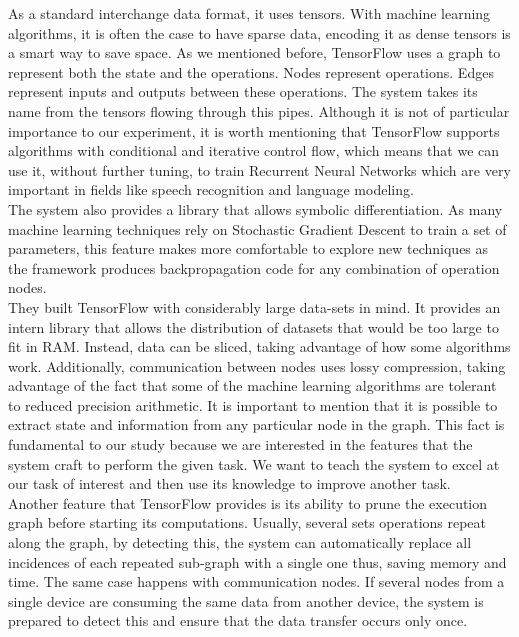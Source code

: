 As a standard interchange data format, it uses tensors. With machine learning algorithms, it is often the case to have sparse data, encoding it as dense tensors is a smart way to save space. As we mentioned before, TensorFlow uses a graph to represent both the state and the operations. Nodes represent operations. Edges represent inputs and outputs between these operations. The system takes its name from the tensors flowing through this pipes. Although it is not of particular importance to our experiment, it is worth mentioning that TensorFlow supports algorithms with conditional and iterative control flow, which means that we can use it, without further tuning, to train Recurrent Neural Networks which are very important in fields like speech recognition and language modeling.\\

The system also provides a library that allows symbolic differentiation. As many machine learning techniques rely on Stochastic Gradient Descent to train a set of parameters, this feature makes more comfortable to explore new techniques as the framework produces backpropagation code for any combination of operation nodes.\\

They built TensorFlow with considerably large data-sets in mind. It provides an intern library that allows the distribution of datasets that would be too large to fit in RAM. Instead, data can be sliced, taking advantage of how some algorithms work. Additionally, communication between nodes uses lossy compression, taking advantage of the fact that some of the machine learning algorithms are tolerant to reduced precision arithmetic. It is important to mention that it is possible to extract state and information from any particular node in the graph. This fact is fundamental to our study because we are interested in the features that the system craft to perform the given task. We want to teach the system to excel at our task of interest and then use its knowledge to improve another task.\\

Another feature that TensorFlow provides is its ability to prune the execution graph before starting its computations. Usually, several sets operations repeat along the graph, by detecting this, the system can automatically replace all incidences of each repeated sub-graph with a single one thus, saving memory and time. The same case happens with communication nodes. If several nodes from a single device are consuming the same data from another device, the system is prepared to detect this and ensure that the data transfer occurs only once.\\

